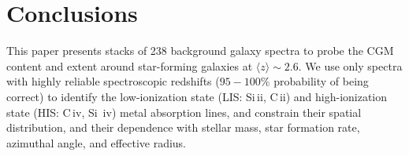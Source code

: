 \documentclass[longauth]{aa}
\begin{document}

\section{Conclusions}\label{sec:Con}

This paper presents stacks of 238 background galaxy spectra to probe the
CGM content and extent around star-forming galaxies at $\langle
z \rangle \sim 2.6$. We use only spectra with highly reliable spectroscopic
redshifts ($95-100\%$ probability  of being correct) to identify the
low-ionization state (LIS: Si\,{\sc ii}, C\,{\sc ii}) and high-ionization
state (HIS: C\,{\sc iv}, Si\, {\sc iv}) metal absorption lines, and constrain
their spatial distribution, and their dependence with stellar mass, star
formation rate, azimuthal angle, and effective radius.
\end{document}
